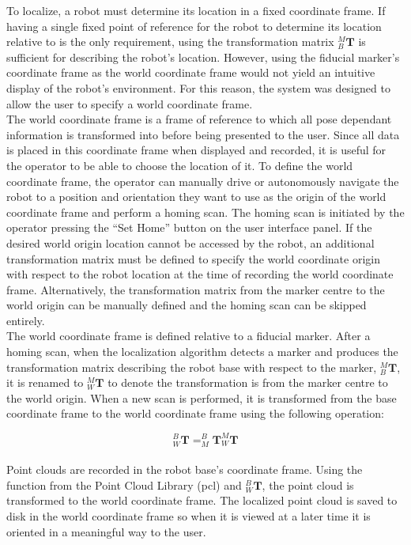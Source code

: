 To localize, a robot must determine its location in a fixed coordinate frame. If having a single fixed point of reference for the robot to determine its location relative to is the only requirement, using the transformation matrix $^{M}_{B}\mathbf{T}$ is sufficient for describing the robot's location. However, using the fiducial marker's coordinate frame as the world coordinate frame would not yield an intuitive display of the robot's environment. For this reason, the system was designed to allow the user to specify a world coordinate frame.\\

The world coordinate frame is a frame of reference to which all pose dependant information is transformed into before being presented to the user. Since all data is placed in this coordinate frame when displayed and recorded, it is useful for the operator to be able to choose the location of it. To define the world coordinate frame, the operator can manually drive or autonomously navigate the robot to a position and orientation they want to use as the origin of the world coordinate frame and perform a homing scan. The homing scan is initiated by the operator pressing the ``Set Home'' button on the user interface panel. If the desired world origin location cannot be accessed by the robot, an additional transformation matrix must be defined to specify the world coordinate origin with respect to the robot location at the time of recording the world coordinate frame. Alternatively, the transformation matrix from the marker centre to the world origin can be manually defined and the homing scan can be skipped entirely.\\

The world coordinate frame is defined relative to a fiducial marker. After a homing scan, when the localization algorithm detects a marker and produces the transformation matrix describing the robot base with respect to the marker, $^{M}_{B}\mathbf{T}$, it is renamed to $^{M}_{W}\mathbf{T}$ to denote the transformation is from the marker centre to the world origin. When a new scan is performed, it is transformed from the base coordinate frame to the world coordinate frame using the following operation:

\begin{equation}
    ^{B}_{W}\mathbf{T} = ^{B}_{M}\mathbf{T}^{M}_{W}\mathbf{T}
\end{equation}\\

Point clouds are recorded in the robot base's coordinate frame. Using the function  from the Point Cloud Library (\acrshort{pcl}) and $^{B}_{W}\mathbf{T}$, the point cloud is transformed to the world coordinate frame. The localized point cloud is saved to disk in the world coordinate frame so when it is viewed at a later time it is oriented in a meaningful way to the user.\\

